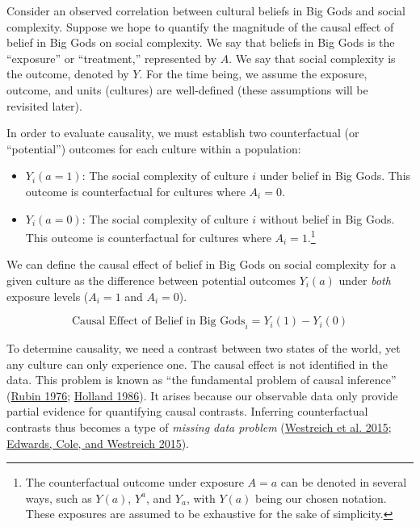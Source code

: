 \documentclass[
  singlecolumn]{report}
\providecommand{\tightlist}{%
  \setlength{\itemsep}{0pt}\setlength{\parskip}{0pt}}\usepackage{longtable,booktabs,array}
\begin{document}
Consider an observed correlation between cultural beliefs in Big Gods
and social complexity. Suppose we hope to quantify the magnitude of the
causal effect of belief in Big Gods on social complexity. We say that
beliefs in Big Gods is the ``exposure'' or ``treatment,'' represented by
\(A\). We say that social complexity is the outcome, denoted by \(Y\).
For the time being, we assume the exposure, outcome, and units
(cultures) are well-defined (these assumptions will be revisited later).

In order to evaluate causality, we must establish two counterfactual (or
``potential'') outcomes for each culture within a population:

\begin{itemize}
\tightlist
\item
  \(Y_i(a = 1)\): The social complexity of culture \(i\) under belief in
  Big Gods. This outcome is counterfactual for cultures where
  \(A_i = 0\).
\item
  \(Y_i(a = 0)\): The social complexity of culture \(i\) without belief
  in Big Gods. This outcome is counterfactual for cultures where
  \(A_i = 1\).\footnote{The counterfactual outcome under exposure
    \(A = a\) can be denoted in several ways, such as \(Y(a)\),
    \(Y^{a}\), and \(Y_a\), with \(Y(a)\) being our chosen notation.
    These exposures are assumed to be exhaustive for the sake of
    simplicity.}
\end{itemize}

We can define the causal effect of belief in Big Gods on social
complexity for a given culture as the difference between potential
outcomes \(Y_i(a)\) under \emph{both} exposure levels (\(A_i = 1\) and
\(A_i = 0\)).

\[
\text{Causal Effect of Belief in Big Gods}_i = Y_i(1) - Y_i(0) 
\]

To determine causality, we need a contrast between two states of the
world, yet any culture can only experience one. The causal effect is not
identified in the data. This problem is known as ``the fundamental
problem of causal inference'' (\protect\hyperlink{ref-rubin1976}{Rubin
1976}; \protect\hyperlink{ref-holland1986}{Holland 1986}). It arises
because our observable data only provide partial evidence for
quantifying causal contrasts. Inferring counterfactual contrasts thus
becomes a type of \emph{missing data problem}
(\protect\hyperlink{ref-westreich2015}{Westreich et al. 2015};
\protect\hyperlink{ref-edwards2015}{Edwards, Cole, and Westreich 2015}).
\end{document}
